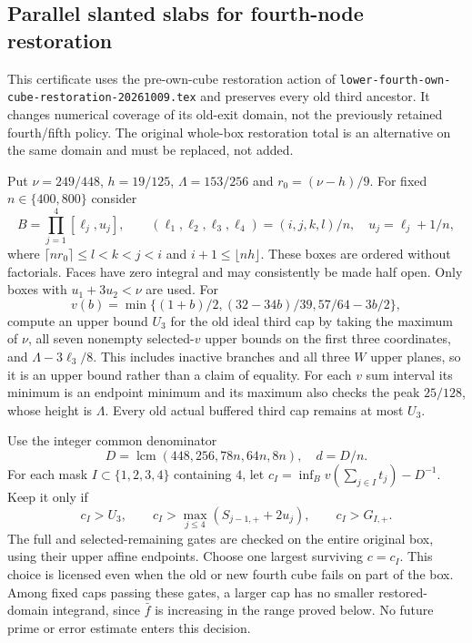 \subsection{Parallel slanted slabs for fourth-node restoration}
\label{sec:fourth-restoration-slanted-20261009}

This certificate uses the pre-own-cube restoration action of
\texttt{lower-fourth-own-cube-restoration-20261009.tex} and preserves
every old third ancestor.  It changes numerical coverage of its
old-exit domain, not the previously retained fourth/fifth policy.
The original whole-box restoration total is an alternative on the
same domain and must be replaced, not added.

Put $\nu=249/448$, $h=19/125$, $\Lambda=153/256$ and
$r_0=(\nu-h)/9$.  For fixed $n\in\{400,800\}$ consider
\[
 B=\prod_{j=1}^4[\ell_j,u_j],\qquad
 (\ell_1,\ell_2,\ell_3,\ell_4)=(i,j,k,l)/n,
 \quad u_j=\ell_j+1/n,
\]
where $\lceil nr_0\rceil\le l<k<j<i$ and
$i+1\le\lfloor nh\rfloor$.  These boxes are ordered without
factorials.  Faces have zero integral and may consistently be made
half open.  Only boxes with $u_1+3u_2<\nu$ are used.
For
\[
 v(b)=\min\{(1+b)/2,(32-34b)/39,57/64-3b/2\},
\]
compute an upper bound $U_3$ for the old ideal third cap by taking
the maximum of $\nu$, all seven nonempty selected-$v$ upper bounds
on the first three coordinates, and $\Lambda-3\ell_3/8$.
This includes inactive branches and all three $W$ upper planes,
so it is an upper bound rather than a claim of equality.
For each $v$ sum interval its minimum is an endpoint minimum and its
maximum also checks the peak $25/128$, whose height is $\Lambda$.
Every old actual buffered third cap remains at most $U_3$.

Use the integer common denominator
\[
 D=\operatorname{lcm}(448,256,78n,64n,8n),\quad d=D/n.
\]
For each mask $I\subset\{1,2,3,4\}$ containing $4$, let
$c_I=\inf_Bv(\sum_{j\in I}t_j)-D^{-1}$.
Keep it only if
\[
 c_I>U_3,\qquad
 c_I>\max_{j\le4}(S_{j-1,+}+2u_j),\qquad c_I>G_{I,+}.
\]
The full and selected-remaining gates are checked on the entire
original box, using their upper affine endpoints.  Choose one
largest surviving $c=c_I$.  This choice is licensed even when the
old or new fourth cube fails on part of the box.  Among fixed caps
passing these gates, a larger cap has no smaller restored-domain
integrand, since $\bar f$ is increasing in the range proved below.
No future prime or error estimate enters this decision.

